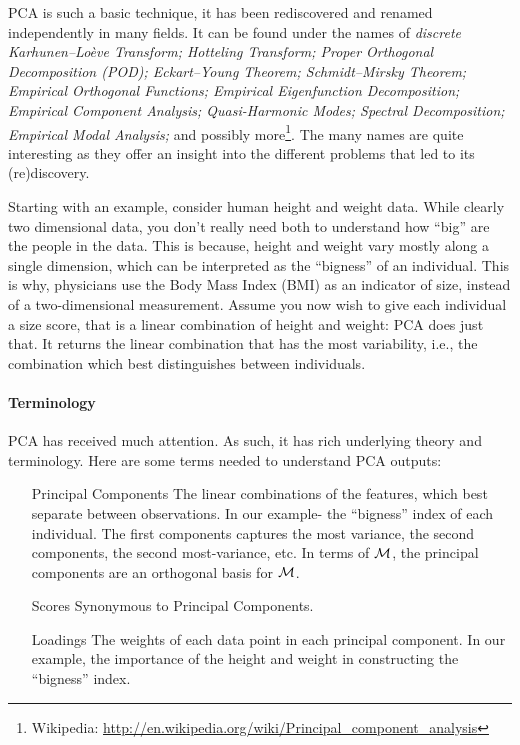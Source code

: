 PCA is such a basic technique, it has been rediscovered and renamed independently in many fields. 
It can be found under the names of \emph{discrete Karhunen–Loève Transform; Hotteling Transform; Proper Orthogonal Decomposition (POD); Eckart–Young Theorem; Schmidt–Mirsky Theorem;  Empirical Orthogonal Functions; Empirical Eigenfunction Decomposition;  Empirical Component Analysis;  Quasi-Harmonic Modes;  Spectral Decomposition;  Empirical Modal Analysis;} and possibly more\footnote{Wikipedia: \url{http://en.wikipedia.org/wiki/Principal_component_analysis} }.
The many names are quite interesting as they offer an insight into the different problems that led to its (re)discovery.

Starting with an example, consider human height and weight data. 
While clearly two dimensional data, you don't really need both to understand how ``big'' are the people in the data. 
This is because, height and weight vary mostly along a single dimension, which can be interpreted as the ``bigness'' of an individual. 
This is why, physicians use the Body Mass Index (BMI) as an indicator of size, instead of a two-dimensional measurement.
Assume you now wish to give each individual a size score, that is a linear combination of height and weight: PCA does just that. It returns the linear combination that has the most variability, i.e., the combination which best distinguishes between individuals. 


\paragraph{Terminology}
PCA has received much attention. As such, it has rich underlying theory and terminology.
Here are some terms needed to understand PCA outputs:
\begin{itemize}
\item[Principal Components] The linear combinations of the features, which best separate between observations. In our example- the ``bigness'' index of each individual. The first components captures the most variance, the second components, the second most-variance, etc. In terms of $\mathcal{M}$, the principal components are an orthogonal basis for $\mathcal{M}$.
\item[Scores] Synonymous to Principal Components.
\item[Loadings] The weights of each data point in each principal component. In our example, the importance of the height and weight in constructing the ``bigness'' index.
\end{itemize}


